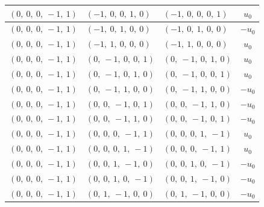 \documentclass[11pt]{article}
\theoremstyle{definition}
\begin{document}
\begin{longtable}{|l|l|l|c|}
    \hline
    $\left( 0, \  0, \  0, \  -1, \  1\right)$ & $\left( -1, \  0, \  0, \  1, \  0\right)$ & $\left( -1, \  0, \  0, \  0, \  1\right)$ & $u_{0}$ \\
    \hline
    $\left( 0, \  0, \  0, \  -1, \  1\right)$ & $\left( -1, \  0, \  1, \  0, \  0\right)$ & $\left( -1, \  0, \  1, \  0, \  0\right)$ & $- u_{0}$ \\
    \hline
    $\left( 0, \  0, \  0, \  -1, \  1\right)$ & $\left( -1, \  1, \  0, \  0, \  0\right)$ & $\left( -1, \  1, \  0, \  0, \  0\right)$ & $u_{0}$ \\
    \hline
    $\left( 0, \  0, \  0, \  -1, \  1\right)$ & $\left( 0, \  -1, \  0, \  0, \  1\right)$ & $\left( 0, \  -1, \  0, \  1, \  0\right)$ & $u_{0}$ \\
    \hline
    $\left( 0, \  0, \  0, \  -1, \  1\right)$ & $\left( 0, \  -1, \  0, \  1, \  0\right)$ & $\left( 0, \  -1, \  0, \  0, \  1\right)$ & $u_{0}$ \\
    \hline
    $\left( 0, \  0, \  0, \  -1, \  1\right)$ & $\left( 0, \  -1, \  1, \  0, \  0\right)$ & $\left( 0, \  -1, \  1, \  0, \  0\right)$ & $- u_{0}$ \\
    \hline
    $\left( 0, \  0, \  0, \  -1, \  1\right)$ & $\left( 0, \  0, \  -1, \  0, \  1\right)$ & $\left( 0, \  0, \  -1, \  1, \  0\right)$ & $- u_{0}$ \\
    \hline
    $\left( 0, \  0, \  0, \  -1, \  1\right)$ & $\left( 0, \  0, \  -1, \  1, \  0\right)$ & $\left( 0, \  0, \  -1, \  0, \  1\right)$ & $- u_{0}$ \\
    \hline
    $\left( 0, \  0, \  0, \  -1, \  1\right)$ & $\left( 0, \  0, \  0, \  -1, \  1\right)$ & $\left( 0, \  0, \  0, \  1, \  -1\right)$ & $u_{0}$ \\
    \hline
    $\left( 0, \  0, \  0, \  -1, \  1\right)$ & $\left( 0, \  0, \  0, \  1, \  -1\right)$ & $\left( 0, \  0, \  0, \  -1, \  1\right)$ & $u_{0}$ \\
    \hline
    $\left( 0, \  0, \  0, \  -1, \  1\right)$ & $\left( 0, \  0, \  1, \  -1, \  0\right)$ & $\left( 0, \  0, \  1, \  0, \  -1\right)$ & $- u_{0}$ \\
    \hline
    $\left( 0, \  0, \  0, \  -1, \  1\right)$ & $\left( 0, \  0, \  1, \  0, \  -1\right)$ & $\left( 0, \  0, \  1, \  -1, \  0\right)$ & $- u_{0}$ \\
    \hline
    $\left( 0, \  0, \  0, \  -1, \  1\right)$ & $\left( 0, \  1, \  -1, \  0, \  0\right)$ & $\left( 0, \  1, \  -1, \  0, \  0\right)$ & $- u_{0}$ \\

\end{longtable}
\end{document}
